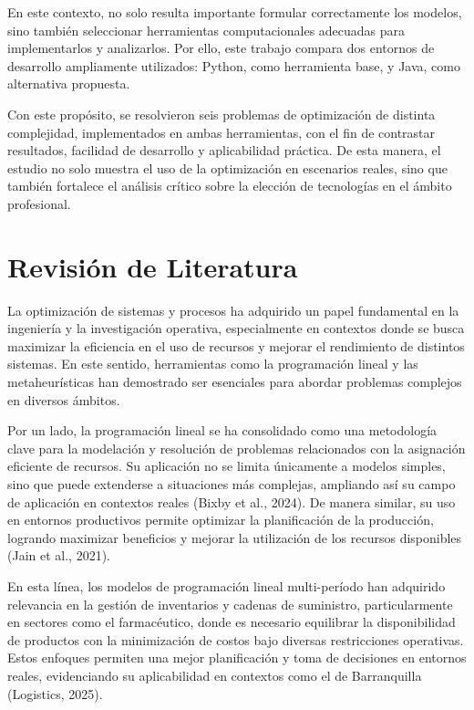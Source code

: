 \documentclass[12pt,a4paper]{article}
\begin{document}
En este contexto, no solo resulta importante formular correctamente los modelos, sino también seleccionar herramientas computacionales adecuadas para implementarlos y analizarlos. Por ello, este trabajo compara dos entornos de desarrollo ampliamente utilizados: Python, como herramienta base, y Java, como alternativa propuesta.

Con este propósito, se resolvieron seis problemas de optimización de distinta complejidad, implementados en ambas herramientas, con el fin de contrastar resultados, facilidad de desarrollo y aplicabilidad práctica. De esta manera, el estudio no solo muestra el uso de la optimización en escenarios reales, sino que también fortalece el análisis crítico sobre la elección de tecnologías en el ámbito profesional.

\section{Revisión de Literatura}

La optimización de sistemas y procesos ha adquirido un papel fundamental en la ingeniería y la investigación operativa, especialmente en contextos donde se busca maximizar la eficiencia en el uso de recursos y mejorar el rendimiento de distintos sistemas. En este sentido, herramientas como la programación lineal y las metaheurísticas han demostrado ser esenciales para abordar problemas complejos en diversos ámbitos.

Por un lado, la programación lineal se ha consolidado como una metodología clave para la modelación y resolución de problemas relacionados con la asignación eficiente de recursos. Su aplicación no se limita únicamente a modelos simples, sino que puede extenderse a situaciones más complejas, ampliando así su campo de aplicación en contextos reales (Bixby et al., 2024). De manera similar, su uso en entornos productivos permite optimizar la planificación de la producción, logrando maximizar beneficios y mejorar la utilización de los recursos disponibles (Jain et al., 2021).

En esta línea, los modelos de programación lineal multi-período han adquirido relevancia en la gestión de inventarios y cadenas de suministro, particularmente en sectores como el farmacéutico, donde es necesario equilibrar la disponibilidad de productos con la minimización de costos bajo diversas restricciones operativas. Estos enfoques permiten una mejor planificación y toma de decisiones en entornos reales, evidenciando su aplicabilidad en contextos como el de Barranquilla (Logistics, 2025).
\end{document}
